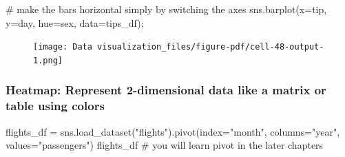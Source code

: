 \documentclass[
  letterpaper,
  DIV=11,
  numbers=noendperiod]{scrreprt}
\newenvironment{Shaded}{\begin{snugshade}}{\end{snugshade}}
\newcommand{\CommentTok}[1]{\textcolor[rgb]{0.37,0.37,0.37}{#1}}
\newcommand{\NormalTok}[1]{\textcolor[rgb]{0.00,0.23,0.31}{#1}}
\newcommand{\OperatorTok}[1]{\textcolor[rgb]{0.37,0.37,0.37}{#1}}
\newcommand{\StringTok}[1]{\textcolor[rgb]{0.13,0.47,0.30}{#1}}
\begin{document}
\begin{Shaded}
\begin{Highlighting}[]
\CommentTok{\# make the bars horizontal simply by switching the axes}
\NormalTok{sns.barplot(x}\OperatorTok{=}\StringTok{\textquotesingle{}tip\textquotesingle{}}\NormalTok{, y}\OperatorTok{=}\StringTok{\textquotesingle{}day\textquotesingle{}}\NormalTok{, hue}\OperatorTok{=}\StringTok{\textquotesingle{}sex\textquotesingle{}}\NormalTok{, data}\OperatorTok{=}\NormalTok{tips\_df)}\OperatorTok{;}
\end{Highlighting}
\end{Shaded}

\begin{figure}[H]

{\centering \texttt{[image: Data visualization\_files/figure-pdf/cell-48-output-1.png]}

}

\end{figure}

\hypertarget{heatmap-represent-2-dimensional-data-like-a-matrix-or-table-using-colors}{%
\subsubsection{Heatmap: Represent 2-dimensional data like a matrix or
table using
colors}\label{heatmap-represent-2-dimensional-data-like-a-matrix-or-table-using-colors}}

\begin{Shaded}
\begin{Highlighting}[]
\NormalTok{flights\_df }\OperatorTok{=}\NormalTok{ sns.load\_dataset(}\StringTok{"flights"}\NormalTok{).pivot(index}\OperatorTok{=}\StringTok{"month"}\NormalTok{, columns}\OperatorTok{=}\StringTok{"year"}\NormalTok{, values}\OperatorTok{=}\StringTok{"passengers"}\NormalTok{)}
\NormalTok{flights\_df}
\CommentTok{\# you will learn pivot in the later chapters}
\end{Highlighting}
\end{Shaded}
\end{document}
